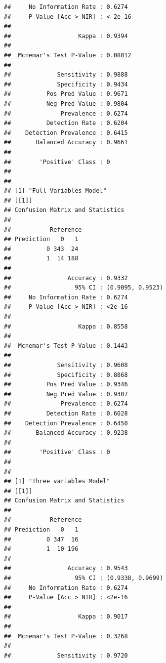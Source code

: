 \documentclass[
]{article}
\begin{document}
\begin{verbatim}
##     No Information Rate : 0.6274          
##     P-Value [Acc > NIR] : < 2e-16         
##                                           
##                   Kappa : 0.9394          
##                                           
##  Mcnemar's Test P-Value : 0.08012         
##                                           
##             Sensitivity : 0.9888          
##             Specificity : 0.9434          
##          Pos Pred Value : 0.9671          
##          Neg Pred Value : 0.9804          
##              Prevalence : 0.6274          
##          Detection Rate : 0.6204          
##    Detection Prevalence : 0.6415          
##       Balanced Accuracy : 0.9661          
##                                           
##        'Positive' Class : 0               
##                                           
## 
## [1] "Full Variables Model"
## [[1]]
## Confusion Matrix and Statistics
## 
##           Reference
## Prediction   0   1
##          0 343  24
##          1  14 188
##                                           
##                Accuracy : 0.9332          
##                  95% CI : (0.9095, 0.9523)
##     No Information Rate : 0.6274          
##     P-Value [Acc > NIR] : <2e-16          
##                                           
##                   Kappa : 0.8558          
##                                           
##  Mcnemar's Test P-Value : 0.1443          
##                                           
##             Sensitivity : 0.9608          
##             Specificity : 0.8868          
##          Pos Pred Value : 0.9346          
##          Neg Pred Value : 0.9307          
##              Prevalence : 0.6274          
##          Detection Rate : 0.6028          
##    Detection Prevalence : 0.6450          
##       Balanced Accuracy : 0.9238          
##                                           
##        'Positive' Class : 0               
##                                           
## 
## [1] "Three variables Model"
## [[1]]
## Confusion Matrix and Statistics
## 
##           Reference
## Prediction   0   1
##          0 347  16
##          1  10 196
##                                           
##                Accuracy : 0.9543          
##                  95% CI : (0.9338, 0.9699)
##     No Information Rate : 0.6274          
##     P-Value [Acc > NIR] : <2e-16          
##                                           
##                   Kappa : 0.9017          
##                                           
##  Mcnemar's Test P-Value : 0.3268          
##                                           
##             Sensitivity : 0.9720          

\end{verbatim}
\end{document}
